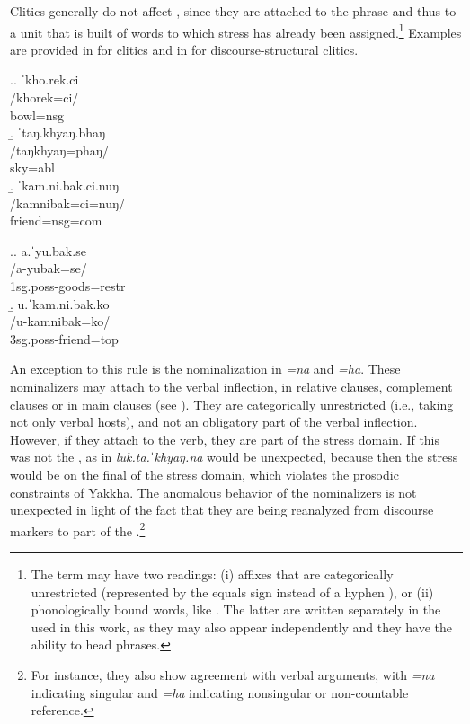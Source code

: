 Clitics generally do not affect , since they are attached to the phrase and thus to a unit that is built of words to which stress has already been assigned.\footnote{The term   may have two readings: (i) affixes that are categorically unrestricted (represented by the equals sign \rede{=} instead of a hyphen \rede{-}), or (ii) phonologically bound words, like . The latter are written separately in the  used in this work, as they  may also appear independently and they have the ability to head phrases.} Examples are provided in \Next for  clitics and in \NNext for discourse-structural clitics.


\ex.\a. \glll ˈkho.rek.ci\\
/khorek=ci/\\
bowl{\sc =nsg}\\
\b. \glll ˈtaŋ.khyaŋ.bhaŋ\\
/taŋkhyaŋ=phaŋ/\\
sky{\sc =abl}\\
\b. \glll ˈkam.ni.bak.ci.nuŋ\\
/kamnibak=ci=nuŋ/\\
friend{\sc =nsg=com}\\


\ex.\a. \glll a.ˈyu.bak.se\\
/a-yubak=se/\\
{\sc 1sg.poss-}goods{\sc =restr}\\
\b. \glll u.ˈkam.ni.bak.ko\\
/u-kamnibak=ko/\\
{\sc 3sg.poss-}friend{\sc =top}\\


An exception to this rule is the nominalization in \emph{=na} and \emph{=ha}. These nominalizers may attach to the verbal inflection, in relative clauses, complement clauses or in main clauses (see ). They are categorically unrestricted (i.e., taking not only verbal hosts), and not an obligatory part of the verbal inflection. However, if they attach to the verb, they are part of the stress domain. If this was not the ,  as in \emph{luk.ta.ˈkhyaŋ.na}  would be unexpected, because then the stress would be on the final  of the stress domain, which violates the prosodic constraints of Yakkha. The anomalous behavior of the nominalizers is not unexpected in light of the fact that they are being reanalyzed from discourse markers to part of the .\footnote{For instance, they also show  agreement with verbal arguments, with \emph{=na} indicating singular and \emph{=ha} indicating nonsingular or non-countable reference.}

